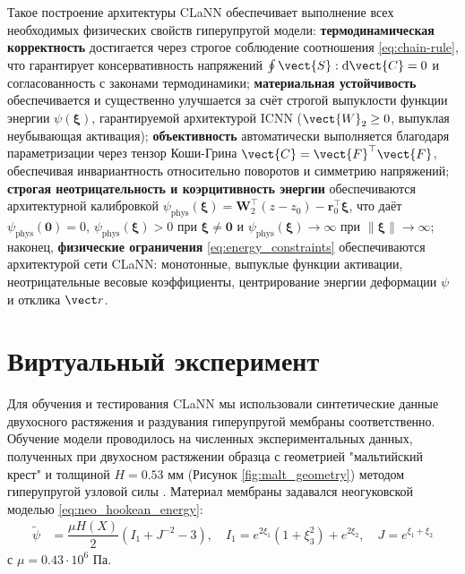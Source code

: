 Такое построение архитектуры CLaNN обеспечивает выполнение всех необходимых физических свойств гиперупругой модели: 
\textbf{термодинамическая корректность} достигается через строгое соблюдение соотношения \eqref{eq:chain-rule}, 
что гарантирует консервативность напряжений $\oint \vect{S}:\mathrm{d}\vect{C} = 0$ и согласованность с законами 
термодинамики; 
\textbf{материальная устойчивость} обеспечивается и существенно улучшается за счёт строгой выпуклости функции энергии 
$\psi(\boldsymbol{\xi})$, гарантируемой архитектурой ICNN ($\vect{W}_2 \ge 0$, выпуклая неубывающая активация); 
\textbf{объективность} автоматически выполняется благодаря параметризации через тензор 
Коши-Грина $\vect{C} = \vect{F}^{\top}\vect{F}$, обеспечивая инвариантность относительно поворотов и симметрию напряжений; 
\textbf{строгая неотрицательность и коэрцитивность энергии} обеспечиваются архитектурной калибровкой 
$\psi_{\mathrm{phys}}(\boldsymbol{\xi}) = \mathbf{W}_2^{\top}(z - z_0) - \mathbf{r}_0^{\top}\boldsymbol{\xi}$,
что даёт $\psi_{\mathrm{phys}}(\mathbf{0})=0$, $\psi_{\mathrm{phys}}(\boldsymbol{\xi})>0$ при $\boldsymbol{\xi}\ne\mathbf{0}$ и 
$\psi_{\mathrm{phys}}(\boldsymbol{\xi})\to\infty$ при $\|\boldsymbol{\xi}\|\to\infty$; 
наконец, \textbf{физические ограничения} \eqref{eq:energy_constraints} обеспечиваются архитектурой сети CLaNN: монотонные, выпуклые функции активации,
неотрицательные весовые коэффициенты, центрирование энергии деформации $\psi$ и отклика $\vect r$.



\section{Виртуальный эксперимент}

Для обучения и тестирования CLaNN мы использовали синтетические  данные двухосного растяжения и раздувания гиперупругой мембраны соответственно.
Обучение модели проводилось на численных экспериментальных данных, 
полученных при двухосном растяжении образца с геометрией "мальтийский крест" и толщиной $H=0.53$ мм (Рисунок \ref{fig:malt_geometry}) методом гиперупругой узловой силы \cite{ddaniso2024}. 
Материал мембраны задавался неогуковской моделью \cite{ogden1997nonlinear} \eqref{eq:neo_hookean_energy}:
\begin{align} \label{eq:neohook}
        \widetilde{\psi} &= \dfrac{\mu H(X)}{2} (I_1 +J^{-2}-3),
        \quad     I_1 = e^{2\xi_1} (1+\xi_3^2)+e^{2\xi_2},\quad J = e^{\xi_1+\xi_2}
\end{align}
с $\mu=0.43\cdot 10^6$ Па.

